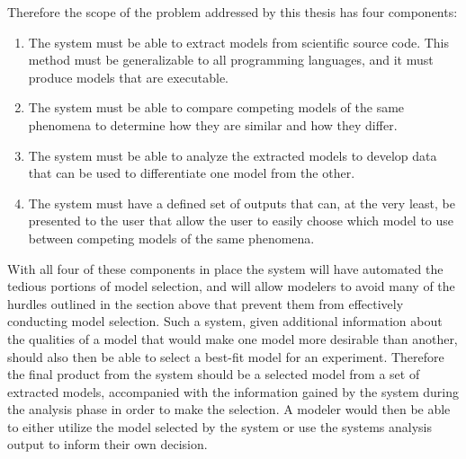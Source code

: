 Therefore the scope of the problem addressed by this thesis has four components:
\begin{enumerate}
  \item The system must be able to extract models from scientific source code. This method must be generalizable to all programming languages, and it must produce models that are executable.
  \item The system must be able to compare competing models of the same phenomena to determine how they are similar and how they differ.
  \item The system must be able to analyze the extracted models to develop data that can be used to differentiate one model from the other.
  \item The system must have a defined set of outputs that can, at the very least, be presented to the user that allow the user to easily choose which model to use between competing models of the same phenomena.
\end{enumerate}

With all four of these components in place the system will have automated the tedious portions of model selection, and will allow modelers to avoid many of the hurdles outlined in the section above that prevent them from effectively conducting model selection. Such a system, given additional information about the qualities of a model that would make one model more desirable than another, should also then be able to select a best-fit model for an experiment. Therefore the final product from the system should be a selected model from a set of extracted models, accompanied with the information gained by the system during the analysis phase in order to make the selection. A modeler would then be able to either utilize the model selected by the system or use the systems analysis output to inform their own decision.


